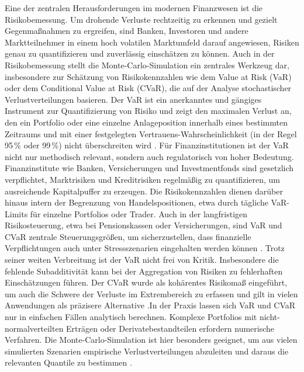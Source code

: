 Eine der zentralen Herausforderungen im modernen Finanzwesen ist die Risikobemessung. Um drohende Verluste rechtzeitig zu erkennen und gezielt Gegenmaßnahmen zu ergreifen, sind Banken, Investoren und andere Marktteilnehmer in einem hoch volatilen Marktumfeld darauf angewiesen, Risiken genau zu quantifizieren und zuverlässig einschätzen zu können. 
Auch in der Risikobemessung stellt die Monte-Carlo-Simulation ein zentrales Werkzeug dar, insbesondere zur Schätzung von Risikokennzahlen wie dem Value at Risk (VaR) oder dem Conditional Value at Risk (CVaR), die auf der Analyse stochastischer Verlustverteilungen basieren. Der VaR ist ein anerkanntes und gängiges Instrument zur Quantifizierung von Risiko und zeigt den maximalen Verlust an, den ein Portfolio oder eine einzelne Anlageposition innerhalb eines bestimmten Zeitraums und mit einer festgelegten Vertrauens-Wahrscheinlichkeit (in der Regel 95\,\% oder 99\,\%) nicht überschreiten wird \cite{springer2025, plos2024}. 
Für Finanzinstitutionen ist der VaR nicht nur methodisch relevant, sondern auch regulatorisch von hoher Bedeutung. Finanzinstitute wie Banken, Versicherungen und Investmentfonds sind gesetzlich verpflichtet, Marktrisiken und Kreditrisiken regelmäßig zu quantifizieren, um ausreichende Kapitalpuffer zu erzeugen. Die Risikokennzahlen dienen darüber hinaus intern der Begrenzung von Handelspositionen, etwa durch tägliche VaR-Limits für einzelne Portfolios oder Trader. Auch in der langfristigen Risikosteuerung, etwa bei Pensionskassen oder Versicherungen, sind VaR und CVaR zentrale Steuerungsgrößen, um sicherzustellen, dass finanzielle Verpflichtungen auch unter Stressszenarien eingehalten werden können \cite{Orús et al., 2019}.
Trotz seiner weiten Verbreitung ist der VaR nicht frei von Kritik. Insbesondere die fehlende Subadditivität kann bei der Aggregation von Risiken zu fehlerhaften Einschätzungen führen. Der CVaR wurde als kohärentes Risikomaß eingeführt, um auch die Schwere der Verluste im Extrembereich zu erfassen und gilt in vielen Anwendungen als präzisere Alternative \cite{orus_quantum_2019}.In der Praxis lassen sich VaR und CVaR nur in einfachen Fällen analytisch berechnen. Komplexe Portfolios mit nicht-normalverteilten Erträgen oder Derivatebestandteilen erfordern numerische Verfahren. Die Monte-Carlo-Simulation ist hier besonders geeignet, um aus vielen simulierten Szenarien empirische Verlustverteilungen abzuleiten und daraus die relevanten Quantile zu bestimmen \cite{Zoufal et al., 2019}.

